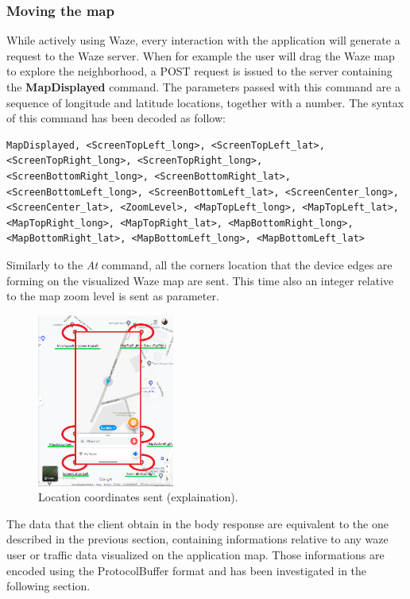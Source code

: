 		\subsubsection{Moving the map}
			\par While actively using Waze, every interaction with the application will generate a request to the Waze server. When for example the user will drag the Waze map to explore the neighborhood, a POST request is issued to the server containing the \textbf{MapDisplayed} command. The parameters passed with this command are a sequence of longitude and latitude locations, together with a number. The syntax of this command has been decoded as follow:
			\begin{lstlisting}
MapDisplayed, <ScreenTopLeft_long>, <ScreenTopLeft_lat>, <ScreenTopRight_long>, <ScreenTopRight_long>, <ScreenBottomRight_long>, <ScreenBottomRight_lat>, <ScreenBottomLeft_long>, <ScreenBottomLeft_lat>, <ScreenCenter_long>, <ScreenCenter_lat>, <ZoomLevel>, <MapTopLeft_long>, <MapTopLeft_lat>, <MapTopRight_long>, <MapTopRight_lat>, <MapBottomRight_long>, <MapBottomRight_lat>, <MapBottomLeft_long>, <MapBottomLeft_lat>
			\end{lstlisting}
			Similarly to the \textit{At} command, all the corners location that the device edges are forming on the visualized Waze map are sent. This time also an integer relative to the map zoom level is sent as parameter. \newline
			\begin{figure}[H]
				\centering
				\includegraphics[width=0.4\textwidth]{images/waze_MapDisplayed_coord_combined.png}
				\caption{Location coordinates sent (explaination).}
			\end{figure}
			The data that the client obtain in the body response are equivalent to the one described in the previous section, containing informations relative to any waze user or traffic data visualized on the application map. Those informations are encoded using the ProtocolBuffer format and has been investigated in the following section.
			

